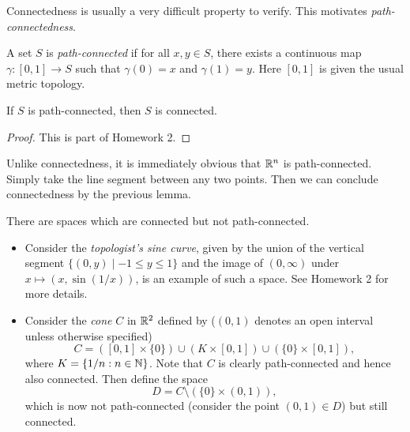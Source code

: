 \begin{remark}
  Connectedness is usually a very difficult
  property to verify. This motivates
  \emph{path-connectedness}.
\end{remark}

\begin{definition}
  A set $S$ is \emph{path-connected} if
  for all $x, y \in S$, there exists a continuous
  map $\gamma : [0, 1] \to S$ such that
  $\gamma(0) = x$ and $\gamma(1) = y$. Here
  $[0, 1]$ is given the usual metric topology.
\end{definition}

\begin{lemma}
  If $S$ is path-connected, then $S$ is connected.
\end{lemma}

\begin{proof}
  This is part of Homework 2.
\end{proof}

\begin{remark}
  Unlike connectedness, it is immediately
  obvious that $\mathbb{R}^n$ is path-connected. Simply
  take the line segment between any two points.
  Then we can conclude connectedness by the previous
  lemma.
\end{remark}

\begin{example}
  There are spaces which are connected but not
  path-connected.
  \begin{itemize}
    \item Consider the
      \emph{topologist's sine curve}, given by
      the union of the vertical segment
      $\{(0, y) \mid -1 \le y \le 1\}$ and the image of
      $(0, \infty)$ under $x \mapsto (x, \sin(1/x))$, is
      an example of such a space. See Homework 2
      for more details.
    \item Consider the \emph{cone} $C$ in
      $\mathbb{R}^2$ defined by ($(0, 1)$ denotes an
      open interval unless otherwise specified)
      \[
        C = ([0, 1] \times \{0\})
        \cup (K \times [0, 1])
        \cup (\{0\} \times [0, 1]),
      \]
      where $K = \{1 / n : n \in \mathbb{N}\}$.
      Note that $C$ is clearly path-connected
      and hence also connected.
      Then define the space
      \[
        D = C \setminus (\{0\} \times (0, 1)),
      \]
      which is now not path-connected (consider
      the point $(0, 1) \in D$)
      but still connected.
  \end{itemize}
\end{example}

